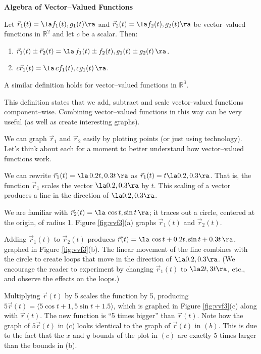 \noindent\textbf{\large Algebra of Vector--Valued Functions}\\

{Let $\vec r_1(t)=\la f_1(t),g_1(t)\ra$ and $\vec r_2(t)=\la f_2(t),g_2(t)\ra$ be vector--valued functions in $\mathbb{R}^2$ and let $c$ be a scalar. Then:
\begin{enumerate}
	\item $\vec r_1(t) \pm \vec r_2(t) = \la\, f_1(t)\pm f_2(t),g_1(t)\pm g_2(t)\,\ra$.
	\item	$c\vec r_1(t) = \la\, cf_1(t),cg_1(t)\,\ra$.
\end{enumerate}
A similar definition holds for vector--valued functions in $\mathbb{R}^3$.
}

This definition states that we add, subtract and scale vector-valued functions component--wise. Combining vector--valued functions in this way can be very useful (as well as create interesting graphs).\\

{We can graph $\vec r_1$ and $\vec r_2$ easily by plotting points (or just using technology). Let's think about each for a moment to better understand how vector--valued functions work.

We can rewrite $\vec r_1(t) = \la\, 0.2t,0.3t\,\ra$ as $ \vec r_1(t) = t\la 0.2,0.3\ra$. That is, the function $\vec r_1$ scales the vector $\la 0.2,0.3\ra$ by $t$. This scaling of a vector produces a line in the direction of $\la 0.2,0.3\ra$. 

We are familiar with $\vec r_2(t) = \la\, \cos t,\sin t\,\ra$; it traces out a circle, centered at the origin, of radius 1. Figure \ref{fig:vvf3}(a) graphs $\vec r_1(t)$ and $\vec r_2(t)$.

Adding $\vec r_1(t)$ to $\vec r_2(t)$ produces $\vec r(t) = \la\,\cos t + 0.2t,\sin t+0.3t\,\ra$, graphed in Figure \ref{fig:vvf3}(b). The linear movement of the line combines with the circle to create loops that move in the direction of $\la 0.2,0.3\ra$.  (We encourage the reader to experiment by changing $\vec r_1(t)$ to $\la 2t,3t\ra$, etc., and observe the effects on the loops.)

Multiplying $\vec r(t)$ by 5 scales the function by 5, producing $5\vec r(t) =  \langle 5\cos t+1,5\sin t+1.5\rangle$, which is graphed in Figure \ref{fig:vvf3}(c) along with $\vec r(t)$. The new function is ``5 times bigger'' than $\vec r(t)$. Note how the graph of $5\vec r(t)$ in (c) looks identical to the graph of $\vec r(t)$ in $(b)$. This is due to the fact that the $x$ and $y$ bounds of the plot in $(c)$ are exactly 5 times larger than the bounds in (b).
}\\

